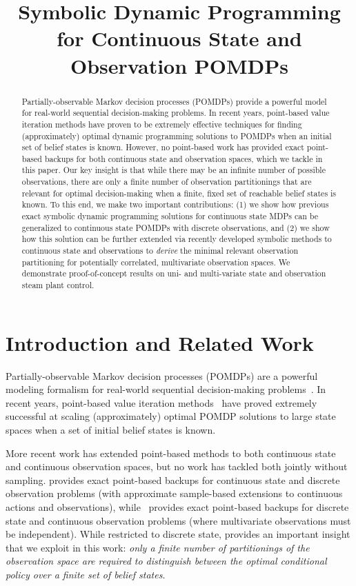 \documentclass{article} %
\title{Symbolic Dynamic Programming for Continuous State and Observation POMDPs}
\author{
}
\begin{document}
\maketitle

\begin{abstract}
Partially-observable Markov decision processes (POMDPs) provide a
powerful model for real-world sequential decision-making problems.  In
recent years, point-based value iteration methods have proven to be
extremely effective techniques for finding (approximately) optimal
dynamic programming solutions to POMDPs when an initial set of belief
states is known.  However, no point-based work has provided exact
point-based backups for both continuous state and observation spaces,
which we tackle in this paper.  Our key insight is that while there
may be an infinite number of possible observations, there are only a
finite number of observation partitionings that are relevant for
optimal decision-making when a finite, fixed set of reachable belief
states is known.  To this end, we make two important contributions:
(1) we show how previous exact symbolic dynamic programming solutions
for continuous state MDPs can be generalized to continuous state
POMDPs with discrete observations, and (2) we show how this solution
can be further extended via recently developed symbolic methods to
continuous state and observations to \emph{derive} the minimal
relevant observation partitioning for potentially correlated,
multivariate observation spaces.
We demonstrate
proof-of-concept results on uni- and multi-variate state and
observation steam plant control.
\end{abstract}

\section{Introduction and Related Work}

Partially-observable Markov decision processes (POMDPs) are a powerful
modeling formalism for real-world sequential decision-making
problems~\cite{kaebling}.  In recent years, point-based value
iteration methods~\cite{pbvi_jair06,hsvi2,Perseus} have proved
extremely successful at scaling (approximately) optimal POMDP
solutions to large state spaces when a set of initial belief states is
known.

More recent work has extended point-based methods to both continuous
state and continuous observation spaces, but no work has tackled both
jointly without sampling.  \cite{Perseus_cont} provides exact
point-based backups for continuous state and discrete observation
problems (with approximate sample-based extensions to continuous
actions and observations), while~\cite{pascal_ijcai05} provides exact
point-based backups for discrete state and continuous observation
problems (where multivariate observations must be independent).  While
restricted to discrete state, \cite{pascal_ijcai05} provides an
important insight that we exploit in this work: \emph{only a finite
number of partitionings of the observation space are required to
distinguish between the optimal conditional policy over a finite set
of belief states}.
\end{document}

